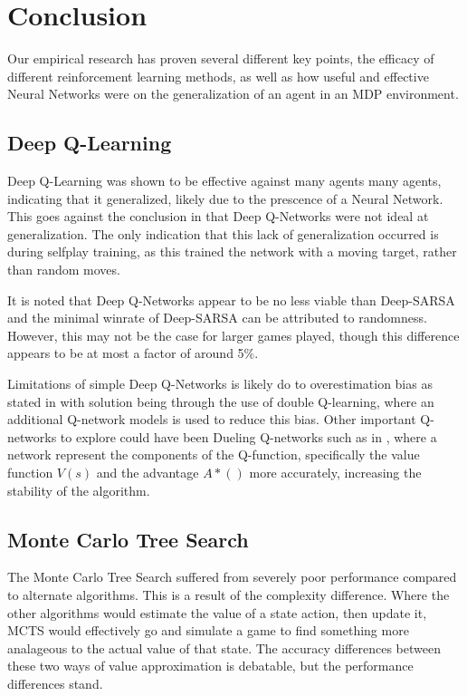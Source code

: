 \section{Conclusion}
Our empirical research has proven several different key points, the efficacy of different reinforcement learning methods, as well as how useful and effective Neural Networks were on the generalization of an agent in an MDP environment.
\subsection{Deep Q-Learning}
Deep Q-Learning was shown to be effective against many agents many agents, indicating that it generalized, likely due to the prescence of a Neural Network. This goes against the conclusion in \citet{ree13} that Deep Q-Networks were not ideal at generalization. The only indication that this lack of generalization occurred is during selfplay training, as this trained the network with a moving target, rather than random moves.

It is noted that Deep Q-Networks appear to be no less viable than Deep-SARSA and the minimal winrate of Deep-SARSA can be attributed to randomness. However, this may not be the case for larger games played, though this difference appears to be at most a factor of around 5\%.

Limitations of simple Deep Q-Networks is likely do to overestimation bias as stated in \citet{8939117} with solution being through the use of double Q-learning, where an additional Q-network models is used to reduce this bias. Other important Q-networks to explore could have been Dueling Q-networks such as in \citet{DBLP:journals/corr/abs-2106-14642}, where a network represent the components of the Q-function, specifically the value function $V(s)$ and the advantage $A*()$ more accurately, increasing the stability of the algorithm.

\subsection{Monte Carlo Tree Search}

The Monte Carlo Tree Search suffered from severely poor performance compared to alternate algorithms. This is a result of the complexity difference. Where the other algorithms would estimate the value of a state action, then update it, MCTS would effectively go and simulate a game to find something more analageous to the actual value of that state. The accuracy differences between these two ways of value approximation is debatable, but the performance differences stand.

